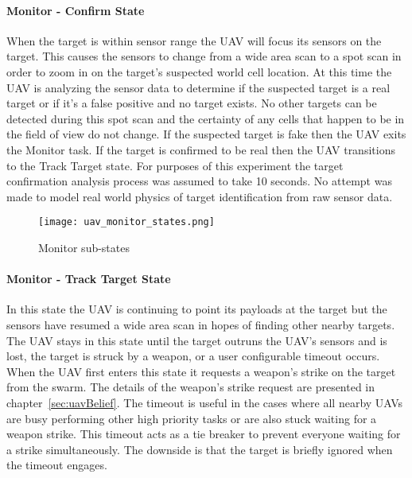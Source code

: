 \paragraph{Monitor - Confirm State}
When the target is within sensor range the UAV will focus its sensors on the target.  This causes the sensors to change from a wide area scan to a spot scan in order to zoom in on the target's suspected world cell location.  At this time the UAV is analyzing the sensor data to determine if the suspected target is a real target or if it's a false positive and no target exists.  No other targets can be detected during this spot scan and the certainty of any cells that happen to be in the field of view do not change.  If the suspected target is fake then the UAV exits the Monitor task.  If the target is confirmed to be real then the UAV transitions to the Track Target state.  For purposes of this experiment the target confirmation analysis process was assumed to take 10 seconds.  No attempt was made to model real world physics of target identification from raw sensor data.


\begin{figure*}%
	\centering
	\texttt{[image: uav\_monitor\_states.png]}
	\caption{Monitor sub-states}
	\label{fig:monitor}
\end{figure*}


\paragraph{Monitor - Track Target State}
In this state the UAV is continuing to point its payloads at the target but the sensors have resumed a wide area scan in hopes of finding other nearby targets.  The UAV stays in this state until the target outruns the UAV's sensors and is lost, the target is struck by a weapon, or a user configurable timeout occurs.  When the UAV first enters this state it requests a weapon's strike on the target from the swarm.  The details of the weapon's strike request are presented in chapter~\ref{sec:uavBelief}.  The timeout is useful in the cases where all nearby UAVs are busy performing other high priority tasks or are also stuck waiting for a weapon strike.  This timeout acts as a tie breaker to prevent everyone waiting for a strike simultaneously.  The downside is that the target is briefly ignored when the timeout engages.

